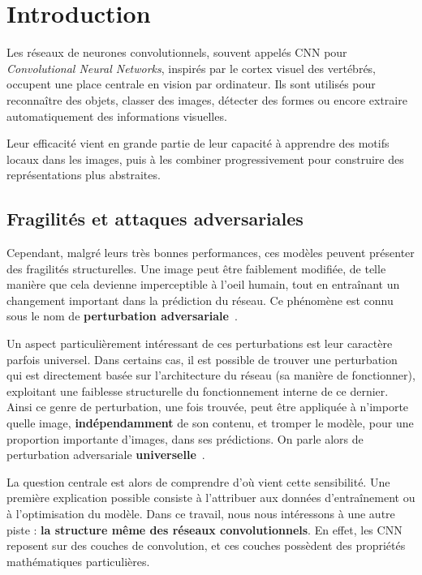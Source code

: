 \chapter{Introduction}

Les réseaux de neurones convolutionnels, souvent appelés CNN pour \textit{Convolutional Neural Networks}, 
inspirés par le cortex visuel des vertébrés, occupent une place centrale en vision par ordinateur. 
Ils sont utilisés pour reconnaître des objets, classer des images, détecter des formes ou encore extraire 
automatiquement des informations visuelles. 

Leur efficacité vient en grande partie de leur capacité à apprendre des motifs locaux dans les 
images, puis à les combiner progressivement pour construire des représentations plus abstraites. 

\section*{Fragilités et attaques adversariales}

Cependant, malgré leurs très bonnes performances, ces modèles peuvent présenter des fragilités structurelles. 
Une image peut être faiblement modifiée, de telle manière que cela devienne imperceptible à l'oeil humain, 
tout en entraînant un changement important dans la prédiction du réseau. Ce phénomène est connu sous le nom de 
\textbf{perturbation adversariale}~\cite{szegedy2014intriguing}.

Un aspect particulièrement intéressant de ces perturbations est leur caractère parfois universel. Dans certains cas, 
il est possible de trouver une perturbation qui est directement basée sur l'architecture du réseau 
(sa manière de fonctionner), exploitant une faiblesse structurelle du fonctionnement interne de ce dernier. 
Ainsi ce genre de perturbation, une fois trouvée, peut être appliquée à n'importe quelle image, 
\textbf{indépendamment} de son contenu, et tromper le modèle, pour une proportion importante d'images,
dans ses prédictions. On parle alors de perturbation adversariale \textbf{universelle}~\cite{moosavi2017universal}. 

La question centrale est alors de comprendre d'où vient cette sensibilité. Une première explication possible 
consiste à l'attribuer aux données d'entraînement ou à l'optimisation du modèle. Dans ce travail, nous nous 
intéressons à une autre piste : \textbf{la structure même des réseaux convolutionnels}. En effet, les CNN 
reposent sur des couches de convolution, et ces couches possèdent des propriétés mathématiques particulières. 

